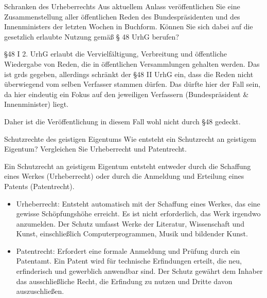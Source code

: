 \documentclass{article}
\begin{document}
\begin{exercise}{Schranken des Urheberrechts}
  Aus aktuellem Anlass veröffentlichen Sie eine Zusammenstellung aller öffentlichen Reden des Bundespräsidenten und des Innenministers der letzten Wochen in Buchform. Können Sie sich dabei auf die gesetzlich erlaubte Nutzung gemäß § 48 UrhG berufen?

  \begin{solution}
    §48 I 2. UrhG erlaubt die Vervielfältigung, Verbreitung und öffentliche Wiedergabe von Reden, die in öffentlichen Versammlungen gehalten werden. Das ist grds gegeben, allerdings schränkt der §48 II UrhG ein, dass die Reden nicht überwiegend vom selben Verfasser stammen dürfen. Das dürfte hier der Fall sein, da hier eindeutig ein Fokus auf den jeweiligen Verfassern (Bundespräsident \& Innenminister) liegt.

    Daher ist die Veröffentlichung in diesem Fall wohl nicht durch §48 gedeckt.
  \end{solution}
\end{exercise}

\begin{exercise}{Schutzrechte des geistigen Eigentums}
  Wie entsteht ein Schutzrecht an geistigem Eigentum? Vergleichen Sie Urheberrecht und Patentrecht.

  \begin{solution}
    Ein Schutzrecht an geistigem Eigentum entsteht entweder durch die Schaffung eines Werkes (Urheberrecht) oder durch die Anmeldung und Erteilung eines Patents (Patentrecht).
    \begin{itemize}
      \item Urheberrecht: Entsteht automatisch mit der Schaffung eines Werkes, das eine gewisse Schöpfungshöhe erreicht. Es ist nicht erforderlich, das Werk irgendwo anzumelden. Der Schutz umfasst Werke der Literatur, Wissenschaft und Kunst, einschließlich Computerprogrammen, Musik und bildender Kunst.
      \item Patentrecht: Erfordert eine formale Anmeldung und Prüfung durch ein Patentamt. Ein Patent wird für technische Erfindungen erteilt, die neu, erfinderisch und gewerblich anwendbar sind. Der Schutz gewährt dem Inhaber das ausschließliche Recht, die Erfindung zu nutzen und Dritte davon auszuschließen.
    \end{itemize}
  \end{solution}
\end{exercise}
\end{document}
